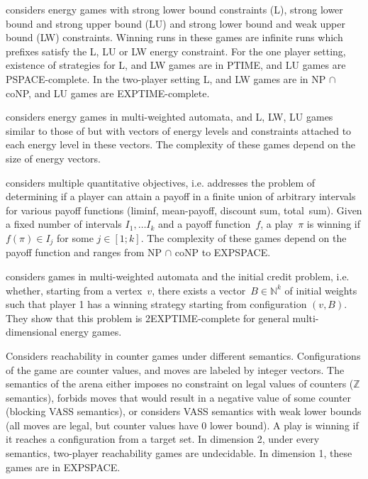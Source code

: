 \cite{BouyerFLMS08} considers energy games with strong lower bound
constraints (L), strong lower bound and strong upper bound (LU) and strong
lower bound and weak upper bound (LW) constraints. Winning runs in these
games are infinite runs which prefixes satisfy the L, LU or LW energy
constraint. For the one player setting, existence of strategies for L,
and LW games are in PTIME, and LU games are PSPACE-complete. In the two-player setting L, and LW games are in
NP $\cap$ coNP, and LU games are EXPTIME-complete.

\cite{FahrenbergJLS11} considers energy games in multi-weighted automata,
and L, LW, LU games similar to those of \cite{BouyerFLMS08} but with
vectors of energy levels and constraints attached to each energy level
in these vectors. The complexity of these games depend on the size of
energy vectors.

\cite{HunterR14} considers multiple quantitative objectives,
i.e. addresses the problem of determining if a player can attain a
payoff in a finite union of arbitrary intervals for various payoff
functions (liminf, mean-payoff, discount sum, total~sum). Given a
fixed number of intervals $I_1, \dots I_k$ and a payoff function~$f$,
a play~$\pi$ is winning if $f(\pi) \in I_j$ for some $j\in [1;k]$. The
complexity of these games depend on the payoff function and ranges from
NP $\cap$ coNP to EXPSPACE.


\cite{JurdzinskiLS15} considers games in multi-weighted automata and
the initial credit problem, i.e. whether, starting from a vertex~$v$,
there exists a vector~$B\in \mathbb N^k$ of initial weights such that player 1 has a
winning strategy starting from configuration $(v,B)$. They show that
this problem is 2EXPTIME-complete for general multi-dimensional energy
games.

\cite{Reichert16} Considers reachability in counter games under different semantics. Configurations of the game are counter values, and moves are labeled by integer vectors. The semantics of the arena either imposes no constraint on legal values of counters ($\mathbb{ Z}$ semantics), forbids moves that would result in a negative value of some counter (blocking VASS semantics), or considers VASS semantics with weak lower bounds (all moves are legal, but counter values have $0$ lower bound). A play is winning if it reaches a configuration from a target set. In dimension 2, under every semantics, two-player reachability games are undecidable. In dimension 1, these games are in EXPSPACE. 



